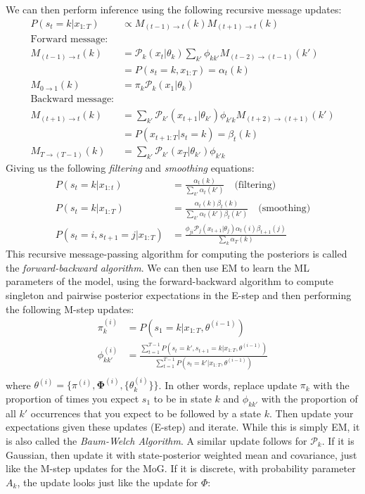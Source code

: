 \documentclass[a4paper]{article}
\begin{document}
We can then perform inference using the following recursive message updates:
\begin{align*}
P(s_t = k|x_{1:T}) &\propto M_{(t-1)\rightarrow t}(k)M_{(t+1)\rightarrow t}(k) \\
\text{Forward message:}& \\
M_{(t-1)\rightarrow t}(k) &= \mathcal{P}_k(x_t|\theta_k)\sum_{k'}\phi_{kk'}M_{(t-2)\rightarrow (t-1)}(k') \\
&= P(s_t=k,x_{1:T}) = \alpha_t(k) \\
M_{0\rightarrow 1}(k) &= \pi_k\mathcal{P}_k(x_1|\theta_k) \\
\text{Backward message:} \\
M_{(t+1)\rightarrow t}(k) &= \sum_{k'} \mathcal{P}_{k'}(x_{t+1}|\theta_{k'})\phi_{k'k}M_{(t+2)\rightarrow (t+1)}(k') \\
&= P(x_{t+1:T}|s_t = k) = \beta_t(k) \\
M_{T\rightarrow (T-1)}(k) &= \sum_{k'} \mathcal{P}_{k'}(x_T|\theta_{k'})\phi_{k'k}
\end{align*}
Giving us the following \emph{filtering} and \emph{smoothing} equations:
\begin{align*}
P(s_t=k|x_{1:t}) &= \frac{\alpha_t(k)}{\sum_{k'}\alpha_t(k')} \quad\text{(filtering)} \\
P(s_t=k|x_{1:T}) &= \frac{\alpha_t(k)\beta_t(k)}{\sum_{k'}\alpha_t(k')\beta_t(k')} \quad\text{(smoothing)} \\
P(s_t=i,s_{t+1}=j|x_{1:T}) &= \frac{\phi_{ji}\mathcal{P}_j(x_{t+1}|\theta_j)\alpha_t(i)\beta_{t+1}(j)}{\sum_k \alpha_T(k)}
\end{align*}
This recursive message-passing algorithm for computing the posteriors is called the \emph{forward-backward algorithm}. We can then use EM to learn the ML parameters of the model, using the forward-backward algorithm to compute singleton and pairwise posterior expectations in the E-step and then performing the following M-step updates:
\begin{align*}
\pi_k^{(i)} &= P(s_1 = k|x_{1:T},\theta^{(i-1)}) \\
\phi_{kk'}^{(i)} &= \frac{\sum_{t=1}^{T-1} P(s_t=k',s_{t+1}=k|x_{1:T},\theta^{(i-1)})}{\sum_{t=1}^{T-1} P(s_t=k'|x_{1:T},\theta^{(i-1)})} \\
\end{align*}
where $\theta^{(i)} = \{\pi^{(i)},\mathbf{\Phi}^{(i)},\{\theta_k^{(i)}\}\}$. In other words, replace update $\pi_k$ with the proportion of times you expect $s_1$ to be in state $k$ and $\phi_{kk'}$ with the proportion of all $k'$ occurrences that you expect to be followed by a state $k$. Then update your expectations given these updates (E-step) and iterate. While this is simply EM, it is also called the \emph{Baum-Welch Algorithm}. A similar update follows for $\mathcal{P}_k$. If it is Gaussian, then update it with state-posterior weighted mean and covariance, just like the M-step updates for the MoG. If it is discrete, with probability parameter $A_k$, the update looks just like the update for $\Phi$:
\end{document}
